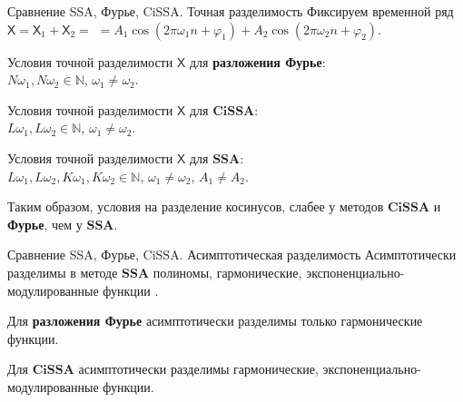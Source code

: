 \documentclass[notheorems, handout]{beamer}
\newcommand{\SSA}{\textbf{SSA}}
\newcommand{\CISSA}{\textbf{CiSSA}}
\newcommand{\TS}{\mathsf{X}}
\begin{document}
	\begin{frame}{Сравнение SSA, Фурье, CiSSA. Точная разделимость}
		Фиксируем временной ряд $\TS = \TS_{1} + \TS_{2} =$ $= A_1 \cos(2\pi \omega_1 n + \varphi_1) + A_2 \cos(2\pi \omega_2 n + \varphi_2)$.

		\bigskip
		Условия точной разделимости $\TS$ для \textbf{разложения Фурье}: \\
		$N\omega_1, N\omega_2 \in \mathbb{N}$, $\omega_1 \not = \omega_2$.

		\medskip
		Условия точной разделимости $\TS$ для $\CISSA$: \\
		$L\omega_1, L\omega_2 \in \mathbb{N}$, $\omega_1 \not = \omega_2$.
		
		\medskip
		Условия точной разделимости $\TS$ для $\SSA$: \\
		$L\omega_1, L\omega_2, K\omega_1, K\omega_2 \in \mathbb{N}$, $\omega_1 \not = \omega_2$, $A_1 \not = A_2$.

		\bigskip
		Таким образом, условия на разделение косинусов, слабее у методов $\CISSA$ и \textbf{Фурье}, чем у $\SSA$.
	\end{frame}


	\begin{frame}{Сравнение SSA, Фурье, CiSSA. Асимптотическая разделимость}
		Асимптотически разделимы в методе $\SSA$ полиномы, гармонические, экспоненциально-модулированные функции \parencite{golyandina2001analysis}.
		
		\medskip

		Для \textbf{разложения Фурье} асимптотически разделимы только гармонические функции.

		\medskip

		Для $\CISSA$ асимптотически разделимы гармонические, экспоненциально-модулированные функции.

	\end{frame}
	
\end{document}
